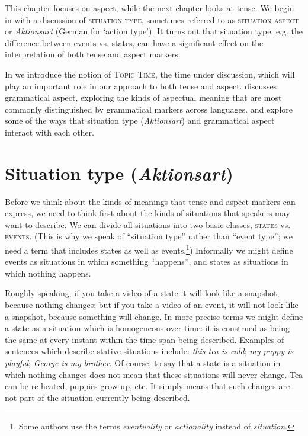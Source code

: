 This chapter focuses on aspect, while the next chapter looks at tense. We begin in  with a discussion of \textsc{situation type}, sometimes referred to as \textsc{situation aspect} or \textit{Aktionsart} (German for ‘action type’). It turns out that situation type, e.g. the difference between events vs. states, can have a significant effect on the interpretation of both tense and aspect markers.



In  we introduce the notion of \textsc{Topic Time}, the time under discussion, which will play an important role in our approach to both tense and aspect.  discusses grammatical aspect, exploring the kinds of aspectual meaning that are most commonly distinguished by grammatical markers across languages.  and  explore some of the ways that situation type (\textit{Aktionsart}) and grammatical aspect interact with each other.


\section{Situation type (\textit{Aktionsart})}\label{sec:20.2}

Before we think about the kinds of meanings that tense and aspect markers can express, we need to think first about the kinds of situations that speakers may want to describe. We can divide all situations into two basic classes, \textsc{states} vs. \textsc{events}. (This is why we speak of “situation type” rather than “event type”; we need a term that includes states as well as events.\footnote{Some authors use the terms \textit{eventuality} or \textit{actionality} instead of \textit{situation}.}) Informally we might define events as situations in which something “happens”, and states as situations in which nothing happens.



Roughly speaking, if you take a video of a state it will look like a snapshot, because nothing changes; but if you take a video of an event, it will not look like a snapshot, because something will change. In more precise terms we might define a state as a situation which is homogeneous over time: it is construed as being the same at every instant within the time span being described. Examples of sentences which describe stative situations include: \textit{this tea is cold}; \textit{my puppy is playful}; \textit{George is my brother}. Of course, to say that a state is a situation in which nothing changes does not mean that these situations will never change. Tea can be re-heated, puppies grow up, etc. It simply means that such changes are not part of the situation currently being described.



